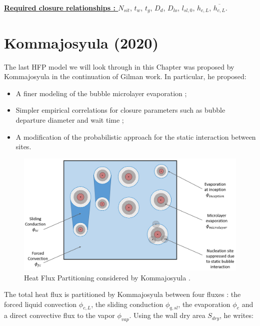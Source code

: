 \npar

\textbf{\underline{Required closure relationships : }} $N_{sit}$, $t_{w}$, $t_{g}$, $D_{d}$, $D_{lo}$, $l_{sl,0}$, $h_{c,L}$, $\overline{h_{c,L}}$. 



\section{Kommajosyula (2020)}
\label{sec:hfp_komma}

The last HFP model we will look through in this Chapter was proposed by Kommajosyula \cite{kommajosyula_development_2020} in the continuation of Gilman \cite{gilman_development_2014} work. In particular, he proposed:

\begin{itemize}
\item A finer modeling of the bubble microlayer evaporation ;
\item Simpler empirical correlations for closure parameters such as bubble departure diameter and wait time ;
\item A modification of the probabilistic approach for the static interaction between sites.
\end{itemize}



\begin{figure}[!h]
\centering
\includegraphics[width=0.8\linewidth]{img/HFP/komma/hfp_komma.PNG}
\caption{Heat Flux Partitioning considered by Kommajosyula \cite{kommajosyula_development_2020}.}%
\label{fig:komma_hfp}
\end{figure}



The total heat flux is partitioned by Kommajosyula between four fluxes : the forced liquid convection $\phi_{c,L}$, the sliding conduction $\phi_{q,sl}$, the evaporation $\phi_{e}$ and a direct convective flux to the vapor $\phi_{vap}$. Using the wall dry area $S_{dry}$, he writes:

